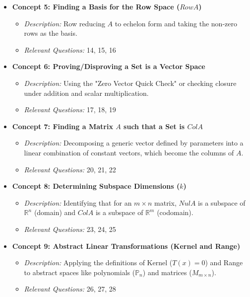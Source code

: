 \documentclass[11pt]{article}
\begin{document}
\begin{itemize}
    \item \textbf{Concept 5: Finding a Basis for the Row Space ($Row A$)}
    \begin{itemize}
        \item \textit{Description:} Row reducing $A$ to echelon form and taking the non-zero rows as the basis.
        \item \textit{Relevant Questions:} 14, 15, 16
    \end{itemize}

    \item \textbf{Concept 6: Proving/Disproving a Set is a Vector Space}
    \begin{itemize}
        \item \textit{Description:} Using the "Zero Vector Quick Check" or checking closure under addition and scalar multiplication.
        \item \textit{Relevant Questions:} 17, 18, 19
    \end{itemize}

    \item \textbf{Concept 7: Finding a Matrix $A$ such that a Set is $Col A$}
    \begin{itemize}
        \item \textit{Description:} Decomposing a generic vector defined by parameters into a linear combination of constant vectors, which become the columns of $A$.
        \item \textit{Relevant Questions:} 20, 21, 22
    \end{itemize}

    \item \textbf{Concept 8: Determining Subspace Dimensions ($k$)}
    \begin{itemize}
        \item \textit{Description:} Identifying that for an $m \times n$ matrix, $Nul A$ is a subspace of $\mathbb{R}^n$ (domain) and $Col A$ is a subspace of $\mathbb{R}^m$ (codomain).
        \item \textit{Relevant Questions:} 23, 24, 25
    \end{itemize}

    \item \textbf{Concept 9: Abstract Linear Transformations (Kernel and Range)}
    \begin{itemize}
        \item \textit{Description:} Applying the definitions of Kernel ($T(x) = 0$) and Range to abstract spaces like polynomials ($\mathbb{P}_n$) and matrices ($M_{m \times n}$).
        \item \textit{Relevant Questions:} 26, 27, 28
    \end{itemize}


\end{itemize}
\end{document}
